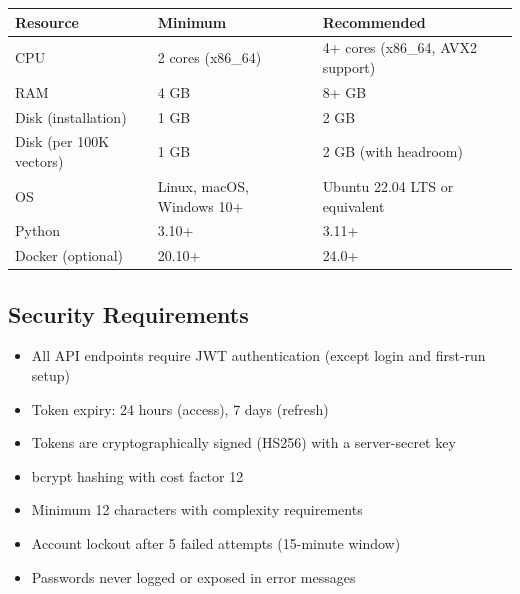 \documentclass[11pt,a4paper]{article}
\begin{document}
\begin{reqbox}
\begin{center}
\begin{tabular}{@{}lll@{}}
\toprule
\textbf{Resource} & \textbf{Minimum} & \textbf{Recommended} \\
\midrule
CPU & 2 cores (x86\_64) & 4+ cores (x86\_64, AVX2 support) \\
RAM & 4 GB & 8+ GB \\
Disk (installation) & 1 GB & 2 GB \\
Disk (per 100K vectors) & 1 GB & 2 GB (with headroom) \\
OS & Linux, macOS, Windows 10+ & Ubuntu 22.04 LTS or equivalent \\
Python & 3.10+ & 3.11+ \\
Docker (optional) & 20.10+ & 24.0+ \\
\bottomrule
\end{tabular}
\end{center}
\end{reqbox}

\subsection{Security Requirements}

\begin{reqbox}
\begin{itemize}
    \item All API endpoints require JWT authentication (except login and first-run setup)
    \item Token expiry: 24 hours (access), 7 days (refresh)
    \item Tokens are cryptographically signed (HS256) with a server-secret key
\end{itemize}
\end{reqbox}

\begin{reqbox}
\begin{itemize}
    \item bcrypt hashing with cost factor 12
    \item Minimum 12 characters with complexity requirements
    \item Account lockout after 5 failed attempts (15-minute window)
    \item Passwords never logged or exposed in error messages
\end{itemize}
\end{reqbox}
\end{document}
